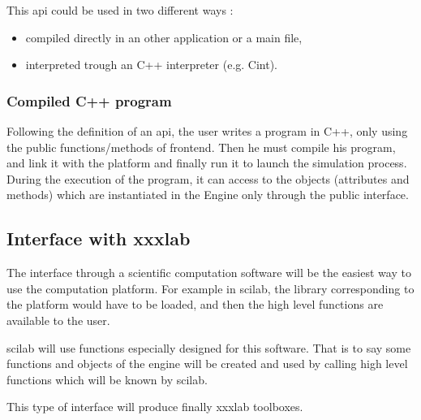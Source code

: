 This \ac{api} could be used in two different ways :
\begin{itemize}
\item compiled directly in an other application or a main file,
\item interpreted trough an C++ interpreter (e.g. Cint).
\end{itemize}


\subsubsection{Compiled C++ program}

Following the definition of an \ac{api}, the user writes a program in C++, only using the public
functions/methods of \ac{frontend}. Then he must compile his program, and link it with the platform and finally run it to launch the simulation process.
During the execution of the program, it can access to the objects (attributes and methods) which are instantiated in the Engine only through the public interface. 



\subsection{Interface with \acs{xxxlab}}
The interface through a scientific computation software will be the easiest way to use the computation platform. For example in
\ac{scilab}, the library corresponding to the platform would have to be loaded, and then the high level functions are available to the user.

\ac{scilab} will use functions especially designed for this software. That is to say some functions and objects of the \ac{engine} will
be created and used by calling high level functions which will be known by \ac{scilab}.

This type of interface will produce finally \ac{xxxlab} toolboxes.

